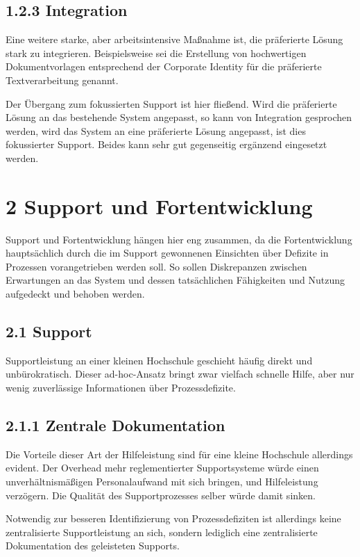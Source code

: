 \documentclass[a4paper]{article}
\begin{document}
\subsection{1.2.3 Integration}
{\sffamily
Eine weitere starke, aber arbeitsintensive Maßnahme ist, die präferierte Lösung stark zu integrieren. Beispielsweise sei
die Erstellung von hochwertigen Dokumentvorlagen entsprechend der Corporate Identity für die präferierte
Textverarbeitung genannt.}

{\sffamily
Der Übergang zum fokussierten Support ist hier fließend. Wird die präferierte Lösung an das bestehende System angepasst,
so kann von Integration gesprochen werden, wird das System an eine präferierte Lösung angepasst, ist dies fokussierter
Support. Beides kann sehr gut gegenseitig ergänzend eingesetzt werden.}

\section{2 Support und Fortentwicklung}
{\sffamily
Support und Fortentwicklung hängen hier eng zusammen, da die Fortentwicklung hauptsächlich durch die im Support
gewonnenen Einsichten über Defizite in Prozessen vorangetrieben werden soll. So sollen Diskrepanzen zwischen
Erwartungen an das System und dessen tatsächlichen Fähigkeiten und Nutzung aufgedeckt und behoben werden.}

\subsection{2.1 Support}
{\sffamily
Supportleistung an einer kleinen Hochschule geschieht häufig direkt und unbürokratisch. Dieser ad-hoc-Ansatz bringt zwar
vielfach schnelle Hilfe, aber nur wenig zuverlässige Informationen über Prozessdefizite.}

\subsection{2.1.1 Zentrale Dokumentation}
{\sffamily
Die Vorteile dieser Art der Hilfeleistung sind für eine kleine Hochschule allerdings evident. Der Overhead mehr
reglementierter Supportsysteme würde einen unverhältnismäßigen Personalaufwand mit sich bringen, und Hilfeleistung
verzögern. Die Qualität des Supportprozesses selber würde damit sinken.}

{\sffamily
Notwendig zur besseren Identifizierung von Prozessdefiziten ist allerdings keine zentralisierte Supportleistung an sich,
sondern lediglich eine zentralisierte Dokumentation des geleisteten Supports.}
\end{document}
